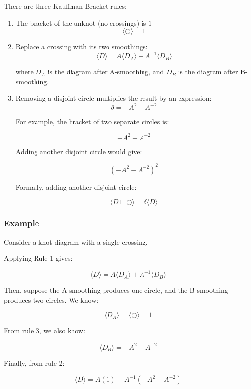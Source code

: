 \documentclass{article}
\begin{document}
There are three Kauffman Bracket rules:
\begin{enumerate}
    \item The bracket of the unknot (no crossings) is $1$
        \[
            \langle \bigcirc \rangle = 1
        \]
    \item Replace a crossing with its two smoothings:
        \[
            \langle D \rangle = A \langle D_A \rangle + A^{-1} \langle D_B \rangle
        \]

        where $D_A$ is the diagram after A-smoothing, and $D_B$ is the diagram after B-smoothing.

    \item Removing a disjoint circle multiplies the result by an expression:
        \[
            \delta = -A^2-A^{-2}
        \]

        For example, the bracket of two separate circles is:

        \[
            -A^2-A^{-2}
        \]

        Adding another disjoint circle would give:

        \[
            (-A^2-A^{-2})^2
        \]

        Formally, adding another disjoint circle:

        \[
            \langle D \sqcup \bigcirc \rangle = \delta \langle D \rangle
        \]
\end{enumerate}

\subsubsection{Example}

Consider a knot diagram with a single crossing.

\hfill

Applying Rule 1 gives:

\[
    \langle D \rangle = A \langle D_A \rangle + A^{-1} \langle D_B \rangle
\]

Then, suppose the A-smoothing produces one circle, and the B-smoothing produces two circles.
We know:

\[
   \langle D_A \rangle = \langle \bigcirc \rangle = 1
\]

From rule 3, we also know:

\[
    \langle D_B \rangle = -A^2-A^{-2}
\]

Finally, from rule 2:

\[
   \langle D \rangle = A(1) + A^{-1}(-A^2-A^{-2})
\]
\end{document}
